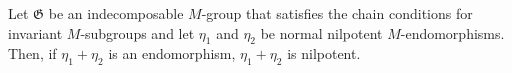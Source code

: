 Let $\mathfrak{G}$ be an indecomposable $M$-group that satisfies the chain conditions for invariant $M$-subgroups and let $\eta_1$ and $\eta_2$ be normal nilpotent $M$-endomorphisms. Then, if $\eta_1 + \eta_2$ is an endomorphism, $\eta_1 + \eta_2$ is nilpotent.
